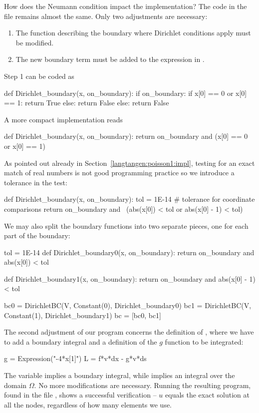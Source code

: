 How does the Neumann condition impact the implementation?  The code
in the file  remains almost the same.  Only two
adjustments are necessary:
\begin{enumerate}
  \item The function describing the boundary where Dirichlet conditions
  apply must be modified.

  \item The new boundary term must be added to the expression in .
\end{enumerate}
Step 1 can be coded as
\begin{python}
def Dirichlet_boundary(x, on_boundary):
    if on_boundary:
        if x[0] == 0 or x[0] == 1:
            return True
        else:
            return False
    else:
        return False
\end{python}
A more compact implementation reads
\begin{python}
def Dirichlet_boundary(x, on_boundary):
    return on_boundary and (x[0] == 0 or x[0] == 1)
\end{python}
As pointed out already in Section~\ref{langtangen:poisson1:impl}, testing
for an exact match of real numbers is not good programming practice so
we introduce a tolerance in the test:
\begin{python}
def Dirichlet_boundary(x, on_boundary):
    tol = 1E-14   # tolerance for coordinate comparisons
    return on_boundary and \
           (abs(x[0]) < tol or abs(x[0] - 1) < tol)
\end{python}
We may also split the boundary functions into two separate pieces,
one for each part of the boundary:
\begin{python}
tol = 1E-14
def Dirichlet_boundary0(x, on_boundary):
    return on_boundary and abs(x[0]) < tol

def Dirichlet_boundary1(x, on_boundary):
    return on_boundary and abs(x[0] - 1) < tol

bc0 = DirichletBC(V, Constant(0), Dirichlet_boundary0)
bc1 = DirichletBC(V, Constant(1), Dirichlet_boundary1)
bc = [bc0, bc1]
\end{python}

The second adjustment of our program concerns the definition of ,
where we have to add a boundary integral and a definition of the $g$
function to be integrated:
\begin{python}
g = Expression("-4*x[1]")
L = f*v*dx - g*v*ds
\end{python}
The  variable implies a boundary integral, while 
implies an integral over the domain $\Omega$.  No more modifications
are necessary. Running the resulting program, found in the file
, shows a successful verification -- $u$ equals the
exact solution at all the nodes, regardless of how many elements we use.

